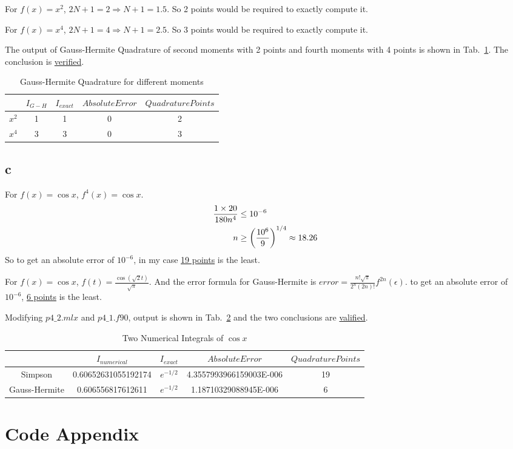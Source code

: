 \documentclass[letterpaper,10pt]{article}
\begin{document}
For $f\left(x\right)=x^2$, $2N+1=2 \Rightarrow N+1=1.5$. So 2 points would be required to exactly compute it. 

For $f\left(x\right)=x^4$, $2N+1=4 \Rightarrow N+1=2.5$. So 3 points would be required to exactly compute it. 

The output of Gauss-Hermite Quadrature of second moments with 2 points and fourth moments with 4 points is shown in Tab.~\ref{tab4_2}. 
The conclusion is \underline{verified}. 
\begin{table}[htbp]
  \centering  
  \caption{Gauss-Hermite Quadrature for different moments}\label{tab4_2}
  \begin{tabular}{ccccc}
    \hline
    & $I_{G-H}$ & $I_{exact}$ & $Absolute Error$ & $Quadrature Points$\\
    \hline
    $x^2$ & 1 & 1 & 0 & 2\\
    $x^4$ & 3 & 3 & 0 & 3\\
    \hline
  \end{tabular}
\end{table}

\subsection{c}
For $f\left(x\right) = \cos x$, $f^{4}\left(x\right) = \cos x$. 
\begin{align}
  \frac{1\times 20}{180n^4} &\leq 10^{-6}\notag\\
  n &\geq \left(\frac{10^6}{9}\right)^{1/4} \approx 18.26
\end{align}
So to get an absolute error of $10^{-6}$, in my case \underline{19 points} is the least.

For $f\left(x\right) = \cos x$, $f\left(t\right) = \frac{\cos \left(\sqrt{2}t\right)}{\sqrt{\pi}}$. 
And the error formula for Gauss-Hermite is $error = \frac{n!\sqrt{\pi}}{2^n\left(2n\right)!}f^{2n}\left(\epsilon\right)$. 
to get an absolute error of $10^{-6}$, \underline{6 points} is the least. 

Modifying $p4\_2.mlx$ and $p4\_1.f90$, output is shown in Tab.~\ref{tab4_3} and the two conclusions are \underline{valified}. 
\begin{table}[htbp]
  \centering  
  \caption{Two Numerical Integrals of $\cos x$}\label{tab4_3}
  \begin{tabular}{ccccc}
    \hline
    & $I_{numerical}$ & $I_{exact}$ & $Absolute Error$ & $Quadrature Points$\\
    \hline
    Simpson & 0.60652631055192174 & $e^{-1/2}$ & 4.3557993966159003E-006 & 19\\
    Gauss-Hermite & 0.606556817612611 & $e^{-1/2}$ & 1.18710329088945E-006 & 6\\
    \hline
  \end{tabular}
\end{table}
\section{Code Appendix}
\end{document}

